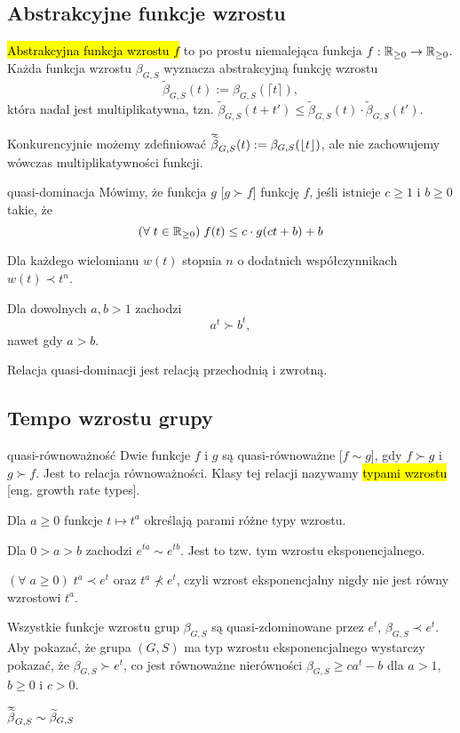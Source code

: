 \subsection{Abstrakcyjne funkcje wzrostu} %

\hl{Abstrakcyjna funkcja wzrostu $f$} to po prostu niemalejąca funkcja $f:\mathbb{R}_{\geq 0}\to \mathbb{R}_{\geq 0}$. Każda funkcja wzrostu $\beta_{G, S}$ wyznacza abstrakcyjną funkcję wzrostu 
$$\widetilde{\beta}_{G,S}(t):=\beta_{G,S}(\lceil t\rceil),$$
która nadal jest multiplikatywna, tzn. $\widetilde{\beta}_{G,S}(t+t')\leq \widetilde{\beta}_{G,S}(t)\cdot\widetilde{\beta}_{G,S}(t')$.

Konkurencyjnie możemy zdefiniować $\doublewidetilde{\beta}_{G,S}(t):=\beta_{G,S}(\lfloor t\rfloor)$, ale nie zachowujemy wówczas multiplikatywności funkcji.

\begin{definition}{quasi-dominacja}{}
  Mówimy, że funkcja $g$  [$g\succ f$] funkcję $f$, jeśli istnieje $c\geq1$ i $b\geq0$ takie, że
  $$(\forall\;t\in\mathbb{R}_{\geq0})\;f(t)\leq c\cdot g(ct+b)+b$$
\end{definition}

\begin{example}[m]
  \item Dla każdego wielomianu $w(t)$ stopnia $n$ o dodatnich współczynnikach $w(t)\prec t^n$.
  \item Dla dowolnych $a,b>1$ zachodzi 
    $$a^t\succ b^t,$$
    nawet gdy $a>b$.
\end{example}

Relacja quasi-dominacji jest relacją przechodnią i zwrotną.

\subsection{Tempo wzrostu grupy}

\begin{definition}{quasi-równoważność}{}
  Dwie funkcje $f$ i $g$ są quasi-równoważne [$f\sim g$], gdy $f\succ g$ i $g\succ f$. Jest to relacja równoważności. Klasy tej relacji nazywamy \hl{typami wzrostu} [eng. growth rate types].
\end{definition}

\begin{example}[m]
  \item Dla $a\geq0$ funkcje $t\mapsto t^a$ określają parami różne typy wzrostu.
  \item Dla $0>a>b$ zachodzi $e^{ta}\sim e^{tb}$. Jest to tzw. tym wzrostu eksponencjalnego.
  \item $(\forall\;a\geq0)\;t^a\prec e^t$ oraz $t^a\not\prec e^t$, czyli wzrost eksponencjalny nigdy nie jest równy wzrostowi $t^a$.
  \item Wszystkie funkcje wzrostu grup $\beta_{G,S}$ są quasi-zdominowane przez $e^t$, $\beta_{G,S}\prec e^t$. Aby pokazać, że grupa $(G,S)$ ma typ wzrostu eksponencjalnego wystarczy pokazać, że $\beta_{G,S}\succ e^t$, co jest równoważne nierówności $\beta_{G,S}\geq ca^t-b$ dla $a>1$, $b\geq0$ i $c>0$.
  \item $\doublewidetilde{\beta}_{G,S}\sim\widetilde{\beta}_{G,S}$
\end{example}

